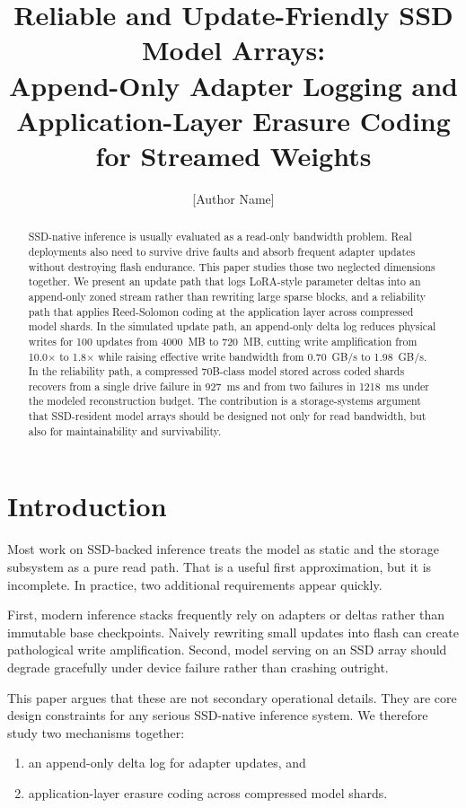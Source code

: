 \documentclass[11pt]{article}
\title{Reliable and Update-Friendly SSD Model Arrays:\\Append-Only Adapter Logging and Application-Layer Erasure Coding for Streamed Weights}
\author{[Author Name]}
\date{}
\begin{document}
\maketitle

\begin{abstract}
SSD-native inference is usually evaluated as a read-only bandwidth problem. Real deployments also need to survive drive faults and absorb frequent adapter updates without destroying flash endurance. This paper studies those two neglected dimensions together. We present an update path that logs LoRA-style parameter deltas into an append-only zoned stream rather than rewriting large sparse blocks, and a reliability path that applies Reed-Solomon coding at the application layer across compressed model shards. In the simulated update path, an append-only delta log reduces physical writes for 100 updates from 4000~MB to 720~MB, cutting write amplification from 10.0$\times$ to 1.8$\times$ while raising effective write bandwidth from 0.70~GB/s to 1.98~GB/s. In the reliability path, a compressed 70B-class model stored across coded shards recovers from a single drive failure in 927~ms and from two failures in 1218~ms under the modeled reconstruction budget. The contribution is a storage-systems argument that SSD-resident model arrays should be designed not only for read bandwidth, but also for maintainability and survivability.
\end{abstract}

\section{Introduction}
Most work on SSD-backed inference treats the model as static and the storage subsystem as a pure read path. That is a useful first approximation, but it is incomplete. In practice, two additional requirements appear quickly.

First, modern inference stacks frequently rely on adapters or deltas rather than immutable base checkpoints. Naively rewriting small updates into flash can create pathological write amplification. Second, model serving on an SSD array should degrade gracefully under device failure rather than crashing outright.

This paper argues that these are not secondary operational details. They are core design constraints for any serious SSD-native inference system. We therefore study two mechanisms together:
\begin{enumerate}
    \item an append-only delta log for adapter updates, and
    \item application-layer erasure coding across compressed model shards.
\end{enumerate}
\end{document}
